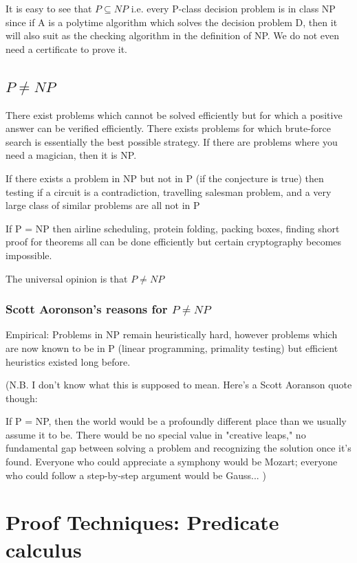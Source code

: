 \documentclass[9pt, letterpaper, oneside]{article}
\begin{document}
It is easy to see that $P \subseteq NP$ i.e. every P-class decision problem is in class NP since if A is a polytime algorithm which solves the decision problem D, then it will also suit as the checking algorithm in the definition of NP. We do not even need a certificate to prove it.

\subsection{$P \neq NP$}

There exist problems which cannot be solved efficiently but for which a positive answer can be verified efficiently. There exists problems for which brute-force search is essentially the best possible strategy. If there are problems where you need a magician, then it is NP.

If there exists a problem in NP but not in P (if the conjecture is true) then testing if a circuit is a contradiction, travelling salesman problem, and a very large class of similar problems are all not in P

If P = NP then airline scheduling, protein folding, packing boxes, finding short proof for theorems all can be done efficiently but certain cryptography becomes impossible.

The universal opinion is that $P \neq NP$

\subsubsection{Scott Aoronson's reasons for $P \neq NP$}

Empirical: Problems in NP remain heuristically hard, however problems which are now known to be in P (linear programming, primality testing) but efficient heuristics existed long before. 

(N.B. I don't know what this is supposed to mean. Here's a Scott Aoranson quote though:

If P = NP, then the world would be a profoundly different place than we usually assume it to be. There would be no special value in "creative leaps," no fundamental gap between solving a problem and recognizing the solution once it's found. Everyone who could appreciate a symphony would be Mozart; everyone who could follow a step-by-step argument would be Gauss... )

\section{Proof Techniques: Predicate calculus}
\end{document}
